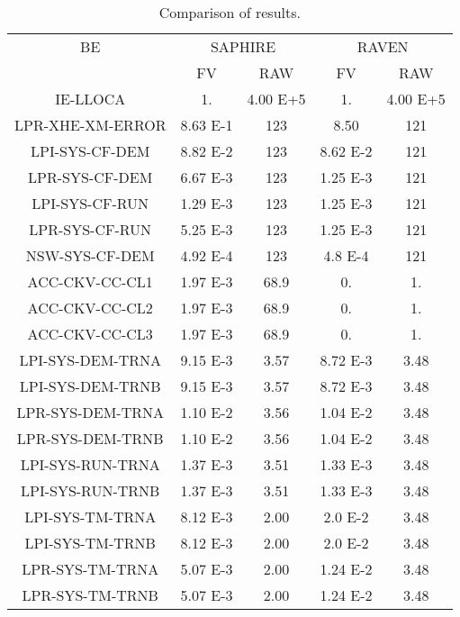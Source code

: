 \begin{table}
	\centering
	\label{tab:case1_RIMs}
	\caption{Comparison of results.}
	\begin{tabular}{*5c}
		\hline
		BE &  \multicolumn{2}{c}{SAPHIRE}     & \multicolumn{2}{c}{RAVEN}\\
		{}               &  FV        &  RAW       &  FV        &  RAW        \\
		\hline
	    IE-LLOCA         &  1.        &  4.00 E+5  &  1.        & 4.00 E+5  \\ 
	    LPR-XHE-XM-ERROR &  8.63 E-1  &  123       &  8.50      & 121   \\
	    LPI-SYS-CF-DEM   &  8.82 E-2  &  123       &  8.62 E-2  & 121   \\ 
	    LPR-SYS-CF-DEM   &  6.67 E-3  &  123       &  1.25 E-3  & 121   \\ 
	    LPI-SYS-CF-RUN   &  1.29 E-3  &  123       &  1.25 E-3  & 121   \\
	    LPR-SYS-CF-RUN   &  5.25 E-3  &  123       &  1.25 E-3  & 121   \\
	    NSW-SYS-CF-DEM   &  4.92 E-4  &  123       &  4.8 E-4   & 121   \\
	    ACC-CKV-CC-CL1   &  1.97 E-3  &  68.9      &  0.        & 1.    \\
	    ACC-CKV-CC-CL2   &  1.97 E-3  &  68.9      &  0.        & 1.    \\
	    ACC-CKV-CC-CL3   &  1.97 E-3  &  68.9      &  0.        & 1.    \\
	    LPI-SYS-DEM-TRNA &  9.15 E-3  &  3.57      &  8.72 E-3  & 3.48  \\
	    LPI-SYS-DEM-TRNB &  9.15 E-3  &  3.57      &  8.72 E-3  & 3.48  \\
	    LPR-SYS-DEM-TRNA &  1.10 E-2  &  3.56      &  1.04 E-2  & 3.48  \\
	    LPR-SYS-DEM-TRNB &  1.10 E-2  &  3.56      &  1.04 E-2  & 3.48  \\
	    LPI-SYS-RUN-TRNA &  1.37 E-3  &  3.51      &  1.33 E-3  & 3.48  \\
	    LPI-SYS-RUN-TRNB &  1.37 E-3  &  3.51      &  1.33 E-3  & 3.48  \\
	    LPI-SYS-TM-TRNA  &  8.12 E-3  &  2.00      &  2.0 E-2   & 3.48  \\
	    LPI-SYS-TM-TRNB  &  8.12 E-3  &  2.00      &  2.0 E-2   & 3.48  \\
	    LPR-SYS-TM-TRNA  &  5.07 E-3  &  2.00      &  1.24 E-2  & 3.48  \\
	    LPR-SYS-TM-TRNB  &  5.07 E-3  &  2.00      &  1.24 E-2  & 3.48  \\
		\hline
	\end{tabular}
\end{table}


